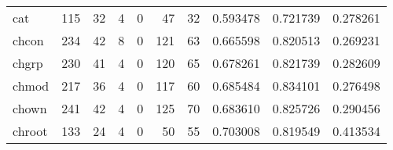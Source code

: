 \begin{longtable}{lrrrrrrrrr}
cat       &                                                115 &                                                 32 &                                                  4 &                                                  0 &                                                 47 &                                                 32 &                                           0.593478 &                               0.721739 &                             0.278261 \\
chcon     &                                                234 &                                                 42 &                                                  8 &                                                  0 &                                                121 &                                                 63 &                                           0.665598 &                               0.820513 &                             0.269231 \\
chgrp     &                                                230 &                                                 41 &                                                  4 &                                                  0 &                                                120 &                                                 65 &                                           0.678261 &                               0.821739 &                             0.282609 \\
chmod     &                                                217 &                                                 36 &                                                  4 &                                                  0 &                                                117 &                                                 60 &                                           0.685484 &                               0.834101 &                             0.276498 \\
chown     &                                                241 &                                                 42 &                                                  4 &                                                  0 &                                                125 &                                                 70 &                                           0.683610 &                               0.825726 &                             0.290456 \\
chroot    &                                                133 &                                                 24 &                                                  4 &                                                  0 &                                                 50 &                                                 55 &                                           0.703008 &                               0.819549 &                             0.413534 \\

\end{longtable}
